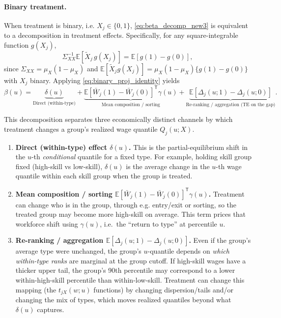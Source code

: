 \documentclass[12pt]{article}
\newcommand{\E}{\mathbb{E}}
\newcommand{\T}{\mathsf{T}} %
\begin{document}
\paragraph{Binary treatment.}
When treatment is binary, i.e. $X_j\in\{0,1\}$, \eqref{eq:beta_decomp_new3} is equivalent to a decomposition in treatment effects. Specifically, for any square-integrable function $g(X_j)$,
\begin{equation}\label{eq:binary_proj_identity}
\Sigma_{XX}^{-1}\E\!\left[\tilde X_j\,g(X_j)\right]
=
\E\!\left[g(1)-g(0)\right],
\end{equation}
since $\Sigma_{XX}=\mu_X(1-\mu_X)$ and $\E[\tilde X_j g(X_j)]=\mu_X(1-\mu_X)\{g(1)-g(0)\}$ with $X_j$ binary. Applying \eqref{eq:binary_proj_identity} yields
\begin{equation}\label{eq:TE_beta_new3}
\beta(u)
=
\underbrace{\delta(u)}_{\text{Direct (within-type)}}
+
\underbrace{\E\!\left[\bar W_j(1)-\bar W_j(0)\right]^{\T}\gamma(u)}_{\text{Mean composition / sorting}}
+
\underbrace{\E\!\left[\Delta_j(u;1)-\Delta_j(u;0)\right]}_{\text{Re-ranking / aggregation (TE on the gap)}}
.
\end{equation}

This decomposition separates three economically distinct channels by which treatment changes a group's realized wage quantile $Q_j(u;X)$.
\begin{enumerate}
\item \textbf{Direct (within-type) effect $\delta(u)$.} This is the partial-equilibrium shift in the $u$-th \emph{conditional} quantile for a fixed type. For example, holding skill group fixed (high-skill vs low-skill), $\delta(u)$ is the average change in the $u$-th wage quantile within each skill group when the group is treated.

\item \textbf{Mean composition / sorting $\E[\bar W_j(1)-\bar W_j(0)]^{\T}\gamma(u)$.} Treatment can change who is in the group, through e.g. entry/exit or sorting, so the treated group may become more high-skill on average. This term prices that workforce shift using $\gamma(u)$, i.e.\ the ``return to type'' at percentile $u$.

\item \textbf{Re-ranking / aggregation $\E[\Delta_j(u;1)-\Delta_j(u;0)]$.} Even if the group's average type were unchanged, the group's $u$-quantile depends on \emph{which within-type ranks} are marginal at the group cutoff. If high-skill wages have a thicker upper tail, the group's 90th percentile may correspond to a lower within-high-skill percentile than within-low-skill. Treatment can change this mapping (the $t_{jX}(w;u)$ functions) by changing dispersion/tails and/or changing the mix of types, which moves realized quantiles beyond what $\delta(u)$ captures.
\end{enumerate}
\end{document}
